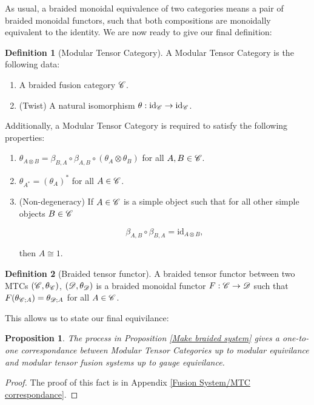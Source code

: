 \documentclass{article}
\newtheorem{proposition}{Proposition}[section]
\theoremstyle{definition}
\newtheorem*{definition}{Definition}
\numberwithin{figure}{section}
\begin{document}
\begin{enumerate}[\thesection .1.]
As usual, a braided monoidal equivalence of two categories means a pair of braided monoidal functors, such that both compositions are monoidally equivalent to the identity. We are now ready to give our final definition:

\begin{definition}[Modular Tensor Category] A Modular Tensor Category is the following data:

\begin{enumerate}
\item A braided fusion category $\mathscr{C}$.
\item (Twist) A natural isomorphism $\theta:\mathrm{id}_{\mathscr{C}} \to \mathrm{id}_{\mathscr{C}}$.
\end{enumerate}

Additionally, a Modular Tensor Category is required to satisfy the following properties:

\begin{enumerate}
\item $\theta_{A\otimes B}=\beta_{B,A}\circ \beta_{A,B}\circ (\theta_{A}\otimes \theta_{B})$ for all $A,B\in \mathscr{C}$.
\item $\theta_{A^*}=\left(\theta_A\right)^*$ for all $A\in \mathscr{C}$.
\item (Non-degeneracy) If $A\in \mathscr{C}$ is a simple object such that for all other simple objects $B\in \mathscr{C}$

$$\beta_{A,B}\circ \beta_{B,A}=\mathrm{id}_{A\otimes B},$$

then $A\cong 1$.
\end{enumerate}
\raggedleft\qedsymbol{}
\end{definition}

\begin{definition}[Braided tensor functor]  A braided tensor functor between two MTCs $(\mathscr{C},\theta_{\mathscr{C}})$, $(\mathscr{D},\theta_{\mathscr{D}})$ is a braided monoidal functor $F:\mathscr{C}\to \mathscr{D}$ such that $F(\theta_{\mathscr{C};A})=\theta_{\mathscr{D};A}$ for all $A\in \mathscr{C}$.

\raggedleft\qedsymbol{}
\end{definition}

This allows us to state our final equivilance:

\begin{proposition}\label{Make MTC} The process in Proposition \ref{Make braided system} gives a one-to-one correspondance between Modular Tensor Categories up to modular equivilance and modular tensor fusion systems up to gauge equivilance.
\end{proposition}
\begin{proof} The proof of this fact is in Appendix \ref{Fusion System/MTC correspondance}.
\end{proof}


\end{enumerate}
\end{document}
